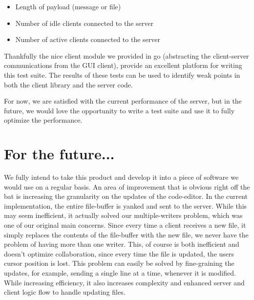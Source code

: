 \documentclass[12pt, letterpaper]{article}
\begin{document}
\begin{itemize}
	\item Length of payload (message or file)
	\item Number of idle clients connected to the server
	\item Number of active clients connected to the server
\end{itemize}

Thankfully the nice client module we provided in go (abstracting the 
client-server communications from the GUI client), provide an excellent 
platform for writing this test suite. The results of these tests can be 
used to identify weak points in both the client library and the server 
code.

For now, we are satisfied with the current performance of the server, 
but in the future, we would love the opportunity to write a test suite 
and use it to fully optimize the performance.

\section*{For the future...}

We fully intend to take this product and develop it into a piece of 
software we would use on a regular basis. An area of improvement that 
is obvious right off the bat is increasing the granularity on the 
updates of the code-editor. In the current implementation, the entire 
file-buffer is yanked and sent to the server. While this may seem 
inefficient, it actually solved our multiple-writers problem, which was 
one of our original main concerns. Since every time a client receives a 
new file, it simply replaces the contents of the file-buffer with the 
new file, we never have the problem of having more than one writer. 
This, of course is both inefficient and doesn't optimize collaboration, 
since every time the file is updated, the users cursor position is lost. 
This problem can easily be solved by fine-graining the updates, for 
example, sending a single line at a time, whenever it is modified. 
While increasing efficiency, it also increases complexity and enhanced 
server and client logic flow to handle updating files.
\end{document}
